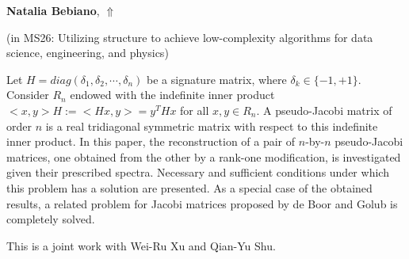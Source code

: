 \documentclass[ILAS2025-program.tex]{subfiles}
\begin{document}
\hypertarget{down0060}{}\begin{ilasabstract}
    
\textbf{Natalia Bebiano},  \hfill \hyperlink{up0060}{$\Uparrow$}
    
    
(in {\color{mstitle}MS26: Utilizing structure to achieve low-complexity algorithms for data science, engineering, and physics})
        
\mtskip
    Let $H= diag(\delta_1, \delta_2, \cdots, \delta_n)$ be a signature matrix, where $\delta_k \in \{-1, +1\}$. Consider $R_n$ endowed with the indefinite inner product $< x, y>H:=< H x, y>= y^T H x$ for all $x, y \in R_n$. A pseudo-Jacobi matrix of order $n$ is a real tridiagonal symmetric matrix with respect to this indefinite inner product. In this paper, the reconstruction of a pair of $n$-by-$n$ pseudo-Jacobi matrices, one obtained from the other by a rank-one modification, is investigated given their prescribed spectra. Necessary and sufficient conditions under which this problem has a solution are presented. As a special case of the obtained results, a related problem for Jacobi matrices proposed by de Boor and Golub is completely solved.
 
This is a joint work with Wei-Ru Xu and Qian-Yu Shu.
\end{ilasabstract}
    
\end{document}
